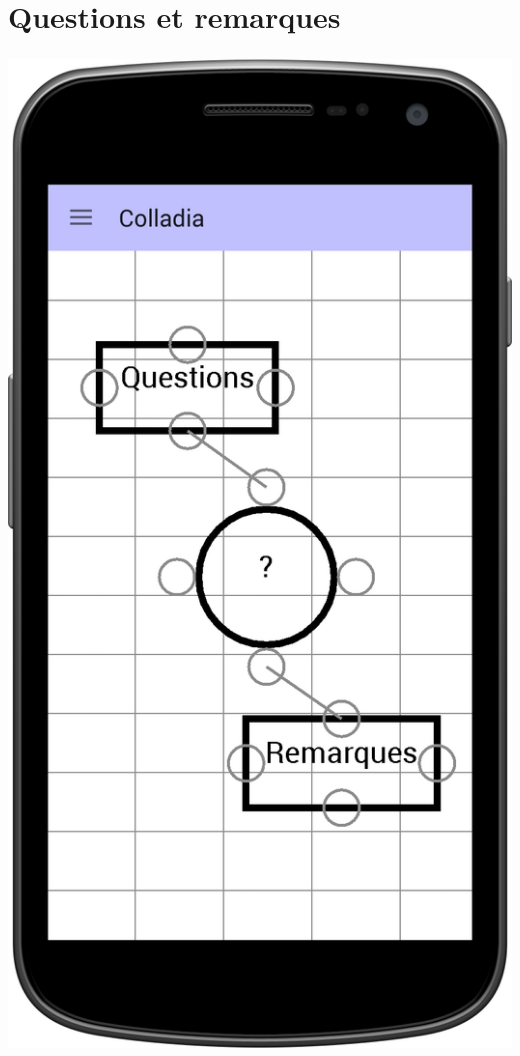 \documentclass[11pt]{beamer}
\begin{document}
\section{Questions et remarques}
\begin{frame}
  \frametitle{\currentname}
  \begin{center}
  \includegraphics[scale=0.12]{img/thats-a-question}
  \end{center}
\end{frame}
\end{document}
